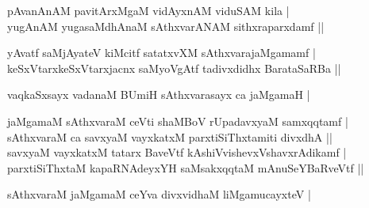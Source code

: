 \begin{entry}
\begin{shl}
pAvanAnAM pavitArxMgaM vidAyxnAM viduSAM kila |\\
yugAnAM yugasaMdhAnaM sAthxvarANAM sithxraparxdamf ||
\end{shl}
\begin{shl}
yAvatf saMjAyateV kiMcitf satatxvXM sAthxvarajaMgamamf |\\
keSxVtarxkeSxVtarxjacnx saMyoVgAtf tadivxdidhx BarataSaRBa ||
\end{shl}
\begin{shl}
vaqkaSxsayx vadanaM BUmiH sAthxvarasayx ca jaMgamaH |
\end{shl}
\begin{shl}
jaMgamaM sAthxvaraM ceVti shaMBoV rUpadavxyaM samxqqtamf |\\
sAthxvaraM ca savxyaM vayxkatxM parxtiSiThxtamiti divxdhA ||\\
savxyaM vayxkatxM tatarx BaveVtf kAshiVvishevxVshavxrAdikamf |\\
parxtiSiThxtaM kapaRNAdeyxYH saMsakxqqtaM mAnuSeYBaRveVtf ||
\end{shl}
\begin{shl}
sAthxvaraM jaMgamaM ceYva divxvidhaM liMgamucayxteV |
\end{shl}


\end{entry}
